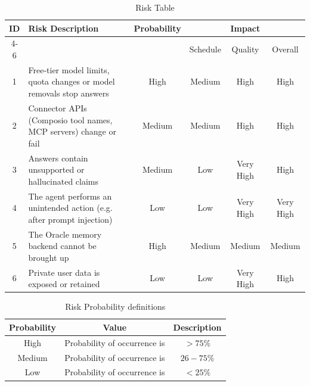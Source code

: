 \begin{table}[!htbp]
\begin{center}
\def\arraystretch{1.5}
\begin{tabularx}{\textwidth}{| c | X | c | c | c | c |}
\hline
\multirow{2}{*}{ID} & \multirow{2}{*}{Risk Description}	& \multirow{2}{*}{Probability} & \multicolumn{3}{|c|}{Impact} \\ \cline{4-6}
	& & &	Schedule	& Quality	& Overall \\ \hline
1	& Free-tier model limits, quota changes or model removals stop answers	& High	& Medium	& High	& High \\ \hline
2	& Connector APIs (Composio tool names, MCP servers) change or fail	& Medium	& Medium	& High	& High \\ \hline
3	& Answers contain unsupported or hallucinated claims	& Medium	& Low	& Very High	& High \\ \hline
4	& The agent performs an unintended action (e.g. after prompt injection)	& Low	& Low	& Very High	& Very High \\ \hline
5	& The Oracle memory backend cannot be brought up	& High	& Medium	& Medium	& Medium \\ \hline
6	& Private user data is exposed or retained	& Low	& Low	& Very High	& High \\ \hline
\end{tabularx}
\end{center}
\caption{Risk Table}
\label{tab:risk}
\end{table}


\begin{table}[!htbp]
\begin{center}
\def\arraystretch{1.5}
\begin{tabular}{| c | c | c |}
\hline
Probability & Value &	Description \\ \hline
High &	Probability of occurrence is &  $ > 75 \% $ \\ \hline
Medium &	Probability of occurrence is  & $26-75 \% $ \\ \hline
Low	& Probability of occurrence is & $ < 25 \% $ \\ \hline
\end{tabular}
\end{center}
\caption{Risk Probability definitions \cite{bookPressman}}
\label{tab:riskdef}
\end{table}

